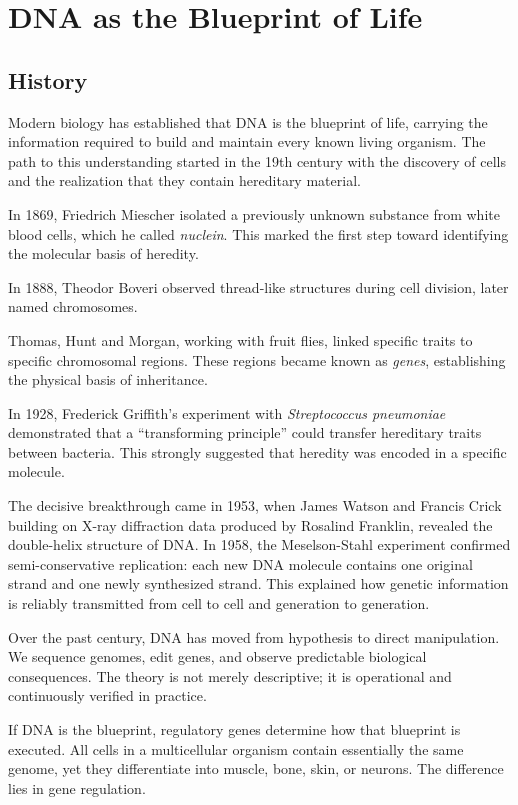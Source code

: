 \chapter{DNA as the Blueprint of Life}
\label{chap:dna-as-blueprint-of-life}

\section*{History}

Modern biology has established that DNA is the blueprint of life, carrying the information required to build and maintain every known living organism.
The path to this understanding started in the 19th century with the discovery of cells and the realization that they contain hereditary material.

In 1869, Friedrich Miescher isolated a previously unknown substance from white blood cells, which he called \emph{nuclein}.
This marked the first step toward identifying the molecular basis of heredity.

In 1888, Theodor Boveri observed thread-like structures during cell division, later named chromosomes. 

Thomas, Hunt and Morgan, working with fruit flies, linked specific traits to specific chromosomal regions.
These regions became known as \emph{genes}, establishing the physical basis of inheritance.

In 1928, Frederick Griffith’s experiment with \emph{Streptococcus pneumoniae} demonstrated that a “transforming principle” could transfer hereditary traits between bacteria. 
This strongly suggested that heredity was encoded in a specific molecule.

The decisive breakthrough came in 1953, when James Watson and Francis Crick building on X-ray diffraction data produced by Rosalind Franklin, revealed the double-helix structure of DNA. 
In 1958, the Meselson-Stahl experiment confirmed semi-conservative replication: each new DNA molecule contains one original strand and one newly synthesized strand. 
This explained how genetic information is reliably transmitted from cell to cell and generation to generation.

Over the past century, DNA has moved from hypothesis to direct manipulation. 
We sequence genomes, edit genes, and observe predictable biological consequences. 
The theory is not merely descriptive; it is operational and continuously verified in practice.

If DNA is the blueprint, regulatory genes determine how that blueprint is executed. 
All cells in a multicellular organism contain essentially the same genome, yet they differentiate into muscle, bone, skin, or neurons. 
The difference lies in gene regulation.

